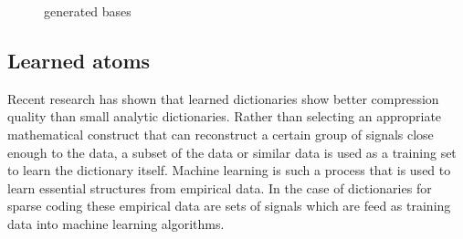 \begin{figure}
\centering
{}
\hspace{5mm}
\hspace{5mm}
\caption{generated bases}

\label{fig:generated_atoms}
\end{figure}

\subsection{Learned atoms}
Recent research\cite{Chen1998,Aharon2006,Mairal2010} has shown that learned
dictionaries show better compression quality than small analytic
dictionaries. Rather than selecting an appropriate mathematical construct that
can reconstruct a certain group of signals close enough to the data, a subset of
the data or similar data is used as a training set to learn the dictionary
itself.
Machine learning is such a process that is used to learn essential structures
from empirical data. In the case of dictionaries for sparse coding these
empirical data are sets of signals which are feed as training data into machine
learning algorithms.


